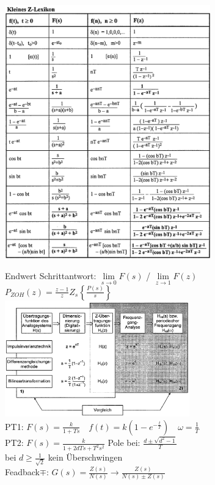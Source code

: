 \begin{minipage}{11cm}
	\includegraphics[height=11cm]{bilder/Z-Lexikon.png}
\end{minipage}
\begin{minipage}{8cm}
	Endwert Schrittantwort: $\lim\limits_{s\rightarrow 0} F(s)$ / $\lim\limits_{z \rightarrow 1} F(z)$\\
	$P_{ZOH}(z)=\frac{z-1}{z} Z_s \left\lbrace  \frac{P(s)}{s} \right\rbrace $\\
	\includegraphics[width=8cm]{bilder/IIR-ArbeitsschritteundVarianten.png}\\
	PT1: $ F(s)=\frac{k}{1+Ts} \quad f(t) = k(1-e^{-\frac{t}{T}}) \quad \omega = \frac{1}{T}$\\
	PT2: $ F(s)=\frac{k}{1+2dTs + T^2s^2}$ \quad Pole bei: $\frac{d \pm \sqrt{d^2-1}}{T}$ \\
	\vspace*{0.5cm} bei $d \geq \frac{1}{\sqrt{2}}$ kein Überschwingen\\
	Feadback$\mp$: $G(s)=\frac{Z(s)}{N(s)} \rightarrow  \frac{Z(s)}{N(s) \pm Z(s)}$
\end{minipage}
